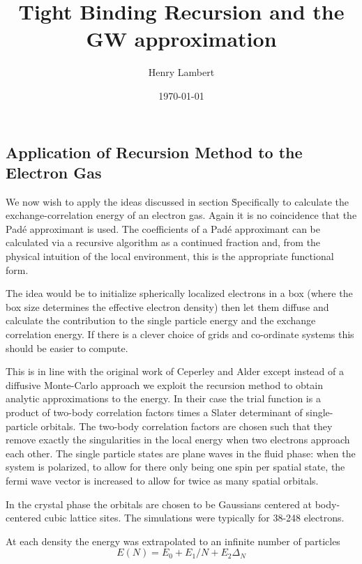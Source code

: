 \documentclass{article}
\begin{document}
\title{Tight Binding Recursion and the GW approximation}
\author{Henry Lambert}
\date{\today}
\maketitle

\subsection{Application of Recursion Method to the Electron Gas}
	We now wish to apply the ideas discussed in section \. Specifically to 
calculate the exchange-correlation energy of an electron gas. Again it is 
no coincidence that the Pad\'e approximant is used. The coefficients
of a Pad\'e approximant can be calculated via a recursive algorithm
as a continued fraction \cite{vidbergserene} and, from the physical
intuition of the local environment, this is the appropriate functional form.

The idea would be to initialize spherically localized electrons in a box 
(where the box size determines the effective electron density)
then let them diffuse and calculate the contribution to the
single particle energy and the exchange correlation energy. 
If there is a clever choice of grids and co-ordinate systems this
should be easier to compute.

This is in line with the original work of Ceperley and Alder \cite{ceperley80} except 
instead of a diffusive Monte-Carlo approach we exploit the
recursion method to obtain analytic approximations to the energy.
In their case the trial function is a product
of two-body correlation factors times a Slater determinant of 
single-particle orbitals. The two-body correlation factors are
chosen such that they remove exactly the singularities in the local energy when two electrons
approach each other. The single particle states are plane waves
in the fluid phase: when the system is polarized, to allow for there only being
one spin per spatial state, the fermi wave vector is increased to allow
for twice as many spatial orbitals. 

In the crystal phase the orbitals are chosen to be Gaussians centered 
at body-centered cubic lattice sites. The simulations were typically 
for 38-248 electrons.

At each density the energy was extrapolated to an infinite number of particles
%
\begin{equation}
E(N) = E_{0} + E_{1}/N + E_{2}\Delta_{N}
\end{equation}
\end{document}
